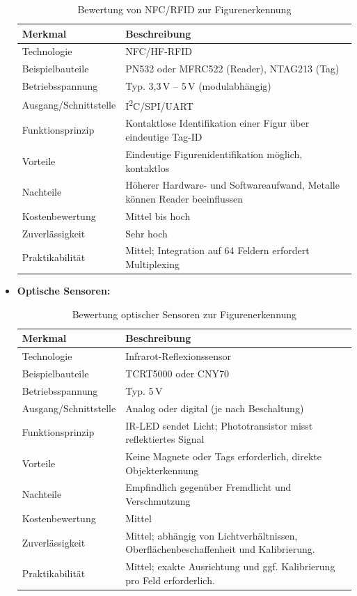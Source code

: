 \begin{itemize}
\begin{table}[H]
\centering
\renewcommand{\arraystretch}{1.3}
\begin{tabular}{|p{4cm}|p{7cm}|}
\hline
\textbf{Merkmal} & \textbf{Beschreibung} \\
\hline
Technologie & NFC/HF-RFID \\
\hline
Beispielbauteile & PN532 oder MFRC522 (Reader), NTAG213 (Tag) \\
\hline
Betriebsspannung & Typ. 3{,}3\,V – 5\,V (modulabhängig) \\
\hline
Ausgang/Schnittstelle & I\textsuperscript{2}C/SPI/UART \\
\hline
Funktionsprinzip & Kontaktlose Identifikation einer Figur über eindeutige Tag-ID \\
\hline
Vorteile & Eindeutige Figurenidentifikation möglich, kontaktlos \\
\hline
Nachteile & Höherer Hardware- und Softwareaufwand, Metalle können Reader beeinflussen \\
\hline
Kostenbewertung & Mittel bis hoch \\
\hline
Zuverlässigkeit & Sehr hoch  \\
\hline
Praktikabilität & Mittel; Integration auf 64 Feldern erfordert Multiplexing \\
\hline
\end{tabular}
\caption{Bewertung von NFC/RFID zur Figurenerkennung}
\label{tab:nfc}
\end{table}
\newpage
\item \textbf{Optische Sensoren:} \cite{vishay_tcrt5000, vishay_cny70}

\begin{table}[H]
\centering
\renewcommand{\arraystretch}{1.3}
\begin{tabular}{|p{4cm}|p{7cm}|}
\hline
\textbf{Merkmal} & \textbf{Beschreibung} \\
\hline
Technologie & Infrarot-Reflexionssensor \\
\hline
Beispielbauteile & TCRT5000 oder CNY70 \\
\hline
Betriebsspannung & Typ. 5\,V \\
\hline
Ausgang/Schnittstelle & Analog oder digital (je nach Beschaltung) \\
\hline
Funktionsprinzip & IR-LED sendet Licht; Phototransistor misst reflektiertes Signal \\
\hline
Vorteile & Keine Magnete oder Tags erforderlich, direkte Objekterkennung \\
\hline
Nachteile & Empfindlich gegenüber Fremdlicht und Verschmutzung \\
\hline
Kostenbewertung & Mittel \\
\hline
Zuverlässigkeit & Mittel; abhängig von Lichtverhältnissen, Oberflächenbeschaffenheit und Kalibrierung. \\
\hline
Praktikabilität & Mittel; exakte Ausrichtung und ggf. Kalibrierung pro Feld erforderlich. \\
\hline
\end{tabular}
\caption{Bewertung optischer Sensoren zur Figurenerkennung}
\label{tab:optisch}
\end{table}
\end{itemize}

